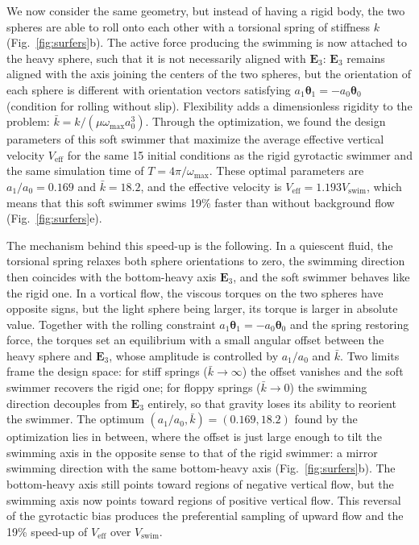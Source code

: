 \documentclass[aps,prfluids,groupedaddress]{revtex4-2}
\newcommand{\btheta}{\bm{\theta}}
\newcommand{\bE}{\bm{E}}
\begin{document}
We now consider the same geometry, but instead of having a rigid body, the two spheres are able to roll onto each other with a torsional spring of stiffness $k$ (Fig.~\ref{fig:surfers}b). The active force producing the swimming is now attached to the heavy sphere, such that it is not necessarily aligned with $\bE_3$: $\bE_3$ remains aligned with the axis joining the centers of the two spheres, but the orientation of each sphere is different with orientation vectors satisfying $a_1 \btheta_1 = -a_0\btheta_0$ (condition for rolling without slip).
Flexibility adds a dimensionless rigidity to the problem: $\bar k = k/(\mu \omega_\mathrm{max} a_0^3)$.
Through the optimization, we found the design parameters of this soft swimmer that maximize the average effective vertical velocity $V_\mathrm{eff}$ for the same 15 initial conditions as the rigid gyrotactic swimmer and the same simulation time of $T=4\pi/ \omega_\mathrm{max}$.
These optimal parameters are $a_1/a_0=0.169$ and $\bar k = 18.2$, and the effective velocity is $V_\mathrm{eff} = 1.193 V_\mathrm{swim}$, which means that this soft swimmer swims 19\% faster than without background flow (Fig.~\ref{fig:surfers}e).

The mechanism behind this speed-up is the following. In a quiescent fluid, the torsional spring relaxes both sphere orientations to zero, the swimming direction then coincides with the bottom-heavy axis $\bE_3$, and the soft swimmer behaves like the rigid one. In a vortical flow, the viscous torques on the two spheres have opposite signs, but the light sphere being larger, its torque is larger in absolute value. Together with the rolling constraint $a_1\btheta_1 = -a_0\btheta_0$ and the spring restoring force, the torques set an equilibrium with a small angular offset between the heavy sphere and $\bE_3$, whose amplitude is controlled by $a_1/a_0$ and $\bar k$. Two limits frame the design space: for stiff springs ($\bar k \to \infty$) the offset vanishes and the soft swimmer recovers the rigid one; for floppy springs ($\bar k \to 0$) the swimming direction decouples from $\bE_3$ entirely, so that gravity loses its ability to reorient the swimmer. The optimum $(a_1/a_0, \bar k) = (0.169, 18.2)$ found by the optimization lies in between, where the offset is just large enough to tilt the swimming axis in the opposite sense to that of the rigid swimmer: a mirror swimming direction with the same bottom-heavy axis (Fig.~\ref{fig:surfers}b). The bottom-heavy axis still points toward regions of negative vertical flow, but the swimming axis now points toward regions of positive vertical flow. This reversal of the gyrotactic bias produces the preferential sampling of upward flow and the 19\% speed-up of $V_\mathrm{eff}$ over $V_\mathrm{swim}$.
\end{document}
